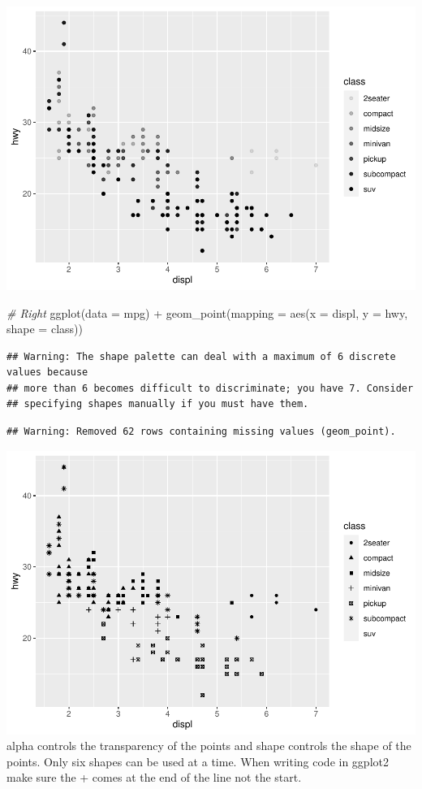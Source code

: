 \documentclass[
]{article}
\newenvironment{Shaded}{\begin{snugshade}}{\end{snugshade}}
\newcommand{\AttributeTok}[1]{\textcolor[rgb]{0.77,0.63,0.00}{#1}}
\newcommand{\CommentTok}[1]{\textcolor[rgb]{0.56,0.35,0.01}{\textit{#1}}}
\newcommand{\FunctionTok}[1]{\textcolor[rgb]{0.00,0.00,0.00}{#1}}
\newcommand{\NormalTok}[1]{#1}
\newcommand{\SpecialCharTok}[1]{\textcolor[rgb]{0.00,0.00,0.00}{#1}}
\begin{document}
\includegraphics{Assignments_files/figure-latex/unnamed-chunk-40-1.pdf}

\begin{Shaded}
\begin{Highlighting}[]
\CommentTok{\# Right}
\FunctionTok{ggplot}\NormalTok{(}\AttributeTok{data =}\NormalTok{ mpg) }\SpecialCharTok{+} 
  \FunctionTok{geom\_point}\NormalTok{(}\AttributeTok{mapping =} \FunctionTok{aes}\NormalTok{(}\AttributeTok{x =}\NormalTok{ displ, }\AttributeTok{y =}\NormalTok{ hwy, }\AttributeTok{shape =}\NormalTok{ class))}
\end{Highlighting}
\end{Shaded}

\begin{verbatim}
## Warning: The shape palette can deal with a maximum of 6 discrete values because
## more than 6 becomes difficult to discriminate; you have 7. Consider
## specifying shapes manually if you must have them.
\end{verbatim}

\begin{verbatim}
## Warning: Removed 62 rows containing missing values (geom_point).
\end{verbatim}

\includegraphics{Assignments_files/figure-latex/unnamed-chunk-40-2.pdf}
alpha controls the transparency of the points and shape controls the
shape of the points. Only six shapes can be used at a time. When writing
code in ggplot2 make sure the + comes at the end of the line not the
start.
\end{document}
